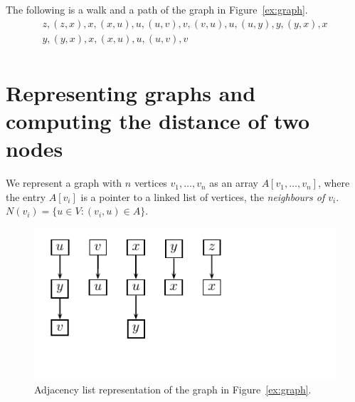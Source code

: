 \begin{example}
  The following is a walk and a path of the graph in
  Figure~\ref{ex:graph}. 
  \begin{displaymath}
    \begin{array}{c}
     z,(z,x),x,(x,u),u,(u,v),v,(v,u),u,(u,y),y,(y,x),x\\
     y,(y,x),x,(x,u),u,(u,v),v\\
    \end{array}
  \end{displaymath}
\end{example}





\section{Representing graphs and computing the distance of two nodes}

\label{sec:repr-graphs-comp}

We represent a graph with $n$ vertices $v_1,\ldots,v_n$  as an array $A[v_1,\ldots,v_n]$, 
where the entry $A[v_i]$ is a pointer to a linked list of vertices, 
the \emph{neighbours of $v_i$}. $N(v_i) = \{ u \in V \colon (v_i,u) \in A\}$.

\begin{figure}
  \centering
 \includegraphics{figures/adjacency.pdf}
  \caption{Adjacency list representation of the graph in
    Figure~\ref{ex:graph}. } 
\end{figure}

